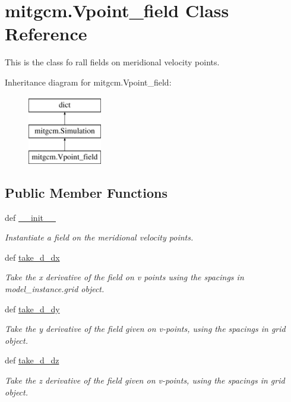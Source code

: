 \hypertarget{classmitgcm_1_1Vpoint__field}{\section{mitgcm.\+Vpoint\+\_\+field Class Reference}
\label{classmitgcm_1_1Vpoint__field}
}


This is the class fo rall fields on meridional velocity points.  


Inheritance diagram for mitgcm.\+Vpoint\+\_\+field\+:\begin{figure}[H]
\begin{center}
\leavevmode
\includegraphics[height=3.000000cm]{classmitgcm_1_1Vpoint__field}
\end{center}
\end{figure}
\subsection*{Public Member Functions}
\begin{DoxyCompactItemize}
\item 
def \hyperlink{classmitgcm_1_1Vpoint__field_a0dead38b0594e3f722eec29586d0451a}{\+\_\+\+\_\+init\+\_\+\+\_\+}
\begin{DoxyCompactList}\small\item\em Instantiate a field on the meridional velocity points. \end{DoxyCompactList}\item 
def \hyperlink{classmitgcm_1_1Vpoint__field_a0735efcbc90505f47a507f102061f18a}{take\+\_\+d\+\_\+dx}
\begin{DoxyCompactList}\small\item\em Take the x derivative of the field on v points using the spacings in model\+\_\+instance.\+grid object. \end{DoxyCompactList}\item 
def \hyperlink{classmitgcm_1_1Vpoint__field_acaccb1a41ec42c0f60c82bf092534b94}{take\+\_\+d\+\_\+dy}
\begin{DoxyCompactList}\small\item\em Take the y derivative of the field given on v-\/points, using the spacings in grid object. \end{DoxyCompactList}\item 
def \hyperlink{classmitgcm_1_1Vpoint__field_a6d06f4b2a5e774bbc711e39ba51723ea}{take\+\_\+d\+\_\+dz}
\begin{DoxyCompactList}\small\item\em Take the z derivative of the field given on v-\/points, using the spacings in grid object. \end{DoxyCompactList}\end{DoxyCompactItemize}
